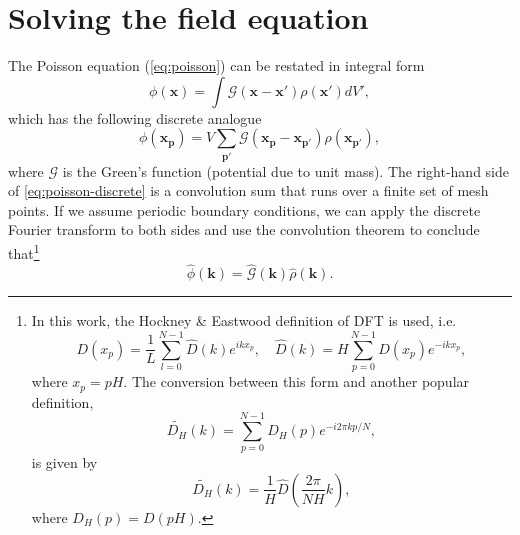 \section{Solving the field equation}\label{sec:solving-the-field-equation}
The Poisson equation (\autoref{eq:poisson}) can be restated in integral form
\begin{equation*}
    \phi(\mathbf{x}) = \int \mathcal{G}(\mathbf{x}-\mathbf{x}')\rho(\mathbf{x}') dV',
\end{equation*}
which has the following discrete analogue
\begin{equation}\label{eq:poisson-discrete}
    \phi(\mathbf{x}_\mathbf{p}) = V \sum_{\mathbf{p}'} \mathcal{G}(\mathbf{x}_\mathbf{p} - \mathbf{x}_{\mathbf{p}'}) \rho(\mathbf{x}_{\mathbf{p}'}),
\end{equation}
where $\mathcal{G}$ is the Green's function (potential due to unit mass).
The right-hand side of \autoref{eq:poisson-discrete} is a convolution sum that runs over a finite set of mesh points.
If we assume periodic boundary conditions, we can apply the discrete Fourier transform to both sides and use the convolution theorem to conclude that\footnote{
    In this work, the Hockney \& Eastwood definition of DFT is used, i.e.
    \begin{equation*}
        D(x_p) = \frac{1}{L}\sum_{l=0}^{N-1}\hat{D}(k)e^{ikx_p}, \quad \hat{D}(k) = H\sum_{p=0}^{N-1}D(x_p)e^{-ikx_p},
    \end{equation*}
    where $x_p = pH$.
    The conversion between this form and another popular definition,
    \begin{equation}\label{eq:standard-dft}
        \widetilde{D_H}(k) = \sum_{p=0}^{N-1}D_H(p)e^{-i2\pi kp / N},
    \end{equation}
    is given by
    \begin{equation*}
        \widetilde{D_H}(k) = \frac{1}{H}\hat{D}\left(\frac{2\pi}{NH}k\right),
    \end{equation*}
    where $D_H(p) = D(pH)$.
}
\begin{equation}\label{eq:poisson-fourier-product}
    \hat{\phi}(\mathbf{k}) = \hat{\mathcal{G}}(\mathbf{k}) \hat{\rho}(\mathbf{k}).
\end{equation}

